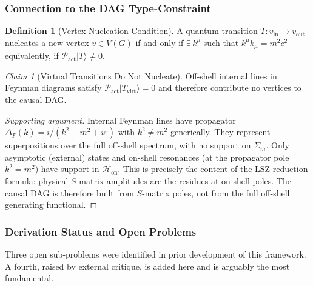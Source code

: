 \documentclass[11pt,a4paper]{article}
\theoremstyle{plain}
\theoremstyle{definition}
\newtheorem{definition}[theorem]{Definition}
\theoremstyle{remark}
\newtheorem{claim}[theorem]{Claim}
\newcommand{\Pact}{\mathcal{P}_{\mathrm{act}}}
\newcommand{\Hon}{\mathcal{H}_{\mathrm{on}}}
\newcommand{\Sigmam}{\Sigma_{m}}
\newcommand{\ket}[1]{|#1\rangle}
\begin{document}
\subsubsection{Connection to the DAG Type-Constraint}

\begin{definition}[Vertex Nucleation Condition]
A quantum transition $T: v_{\mathrm{in}} \to v_{\mathrm{out}}$ nucleates a new
vertex $v \in V(G)$ if and only if $\exists\,k^{\mu}$ such that $k^{\mu}k_{\mu} =
m^{2}c^{2}$---equivalently, if $\Pact\ket{T} \neq 0$.
\end{definition}

\begin{claim}[Virtual Transitions Do Not Nucleate]
Off-shell internal lines in Feynman diagrams satisfy $\Pact\ket{T_{\mathrm{virt}}}
= 0$ and therefore contribute no vertices to the causal DAG.
\end{claim}

\begin{proof}[Supporting argument]
Internal Feynman lines have propagator $\Delta_{F}(k) = i/(k^{2} - m^{2} +
i\varepsilon)$ with $k^{2} \neq m^{2}$ generically. They represent superpositions
over the full off-shell spectrum, with no support on $\Sigmam$. Only asymptotic
(external) states and on-shell resonances (at the propagator pole $k^{2} = m^{2}$)
have support in $\Hon$. This is precisely the content of the LSZ reduction formula:
physical $S$-matrix amplitudes are the residues at on-shell poles. The causal DAG
is therefore built from $S$-matrix poles, not from the full off-shell generating
functional.
\end{proof}

\subsubsection{Derivation Status and Open Problems}
\label{sec:hardwall}

Three open sub-problems were identified in prior development of this framework.
A fourth, raised by external critique, is added here and is arguably the most
fundamental.
\end{document}
